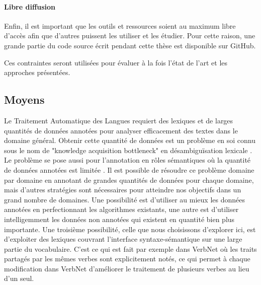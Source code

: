 \paragraph{Libre diffusion} Enfin, il est important que les outils et
ressources soient au maximum libre d'accès afin que d'autres puissent les
utiliser et les étudier. Pour cette raison, une grande partie du code source
écrit pendant cette thèse est disponible sur GitHub.

Ces contraintes seront utilisées pour évaluer à la fois l'état de l'art et les
approches présentées.

\subsection{Moyens}
\label{objectifs_these}

Le Traitement Automatique des Langues requiert des lexiques et de larges
quantités de données annotées pour analyser efficacement des textes dans le
domaine général. Obtenir cette quantité de données est un problème en soi connu
sous le nom de "knowledge acquisition bottleneck" en désambiguïsation lexicale
\citep{gale1992method,navigli2009word}. Le problème se pose aussi pour
l'annotation en rôles sémantiques où la quantité de données annotées est
limitée \citep[section 1]{das2012structure}. Il est possible de résoudre ce problème
domaine par domaine en annotant de grandes quantités de données pour chaque
domaine, mais d'autres stratégies sont nécessaires pour atteindre nos objectifs
dans un grand nombre de domaines. Une possibilité est d'utiliser au mieux les
données annotées en perfectionnant les algorithmes existants, une autre est
d'utiliser intelligemment les données non annotées qui existent en quantité
bien plus importante. Une troisième possibilité, celle que nous choisissons
d'explorer ici, est d'exploiter des lexiques couvrant l'interface
syntaxe-sémantique sur une large partie du vocabulaire. C'est ce qui est fait
par exemple dans VerbNet où les traits partagés par les mêmes verbes sont
explicitement notés, ce qui permet à chaque modification dans VerbNet
d'améliorer le traitement de plusieurs verbes au lieu d'un seul.

